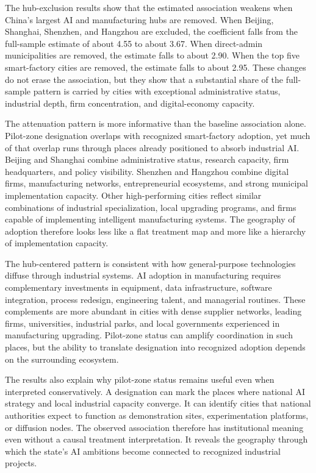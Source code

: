 \documentclass[12pt]{article}
\begin{document}
The hub-exclusion results show that the estimated association weakens when China's largest AI and manufacturing hubs are removed. When Beijing, Shanghai, Shenzhen, and Hangzhou are excluded, the coefficient falls from the full-sample estimate of about 4.55 to about 3.67. When direct-admin municipalities are removed, the estimate falls to about 2.90. When the top five smart-factory cities are removed, the estimate falls to about 2.95. These changes do not erase the association, but they show that a substantial share of the full-sample pattern is carried by cities with exceptional administrative status, industrial depth, firm concentration, and digital-economy capacity.

The attenuation pattern is more informative than the baseline association alone. Pilot-zone designation overlaps with recognized smart-factory adoption, yet much of that overlap runs through places already positioned to absorb industrial AI. Beijing and Shanghai combine administrative status, research capacity, firm headquarters, and policy visibility. Shenzhen and Hangzhou combine digital firms, manufacturing networks, entrepreneurial ecosystems, and strong municipal implementation capacity. Other high-performing cities reflect similar combinations of industrial specialization, local upgrading programs, and firms capable of implementing intelligent manufacturing systems. The geography of adoption therefore looks less like a flat treatment map and more like a hierarchy of implementation capacity.

The hub-centered pattern is consistent with how general-purpose technologies diffuse through industrial systems. AI adoption in manufacturing requires complementary investments in equipment, data infrastructure, software integration, process redesign, engineering talent, and managerial routines. These complements are more abundant in cities with dense supplier networks, leading firms, universities, industrial parks, and local governments experienced in manufacturing upgrading. Pilot-zone status can amplify coordination in such places, but the ability to translate designation into recognized adoption depends on the surrounding ecosystem.

The results also explain why pilot-zone status remains useful even when interpreted conservatively. A designation can mark the places where national AI strategy and local industrial capacity converge. It can identify cities that national authorities expect to function as demonstration sites, experimentation platforms, or diffusion nodes. The observed association therefore has institutional meaning even without a causal treatment interpretation. It reveals the geography through which the state's AI ambitions become connected to recognized industrial projects.
\end{document}
